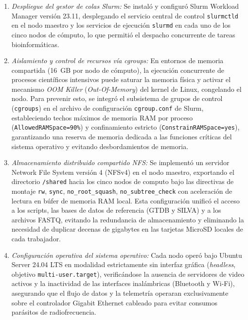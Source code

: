 \documentclass[12pt,oneside,spanish]{book}
\begin{document}
    \begin{enumerate}
        \item \textit{Despliegue del gestor de colas Slurm:} Se instaló y configuró Slurm Workload Manager versión 23.11, desplegando el servicio central de control \texttt{slurmctld} en el nodo maestro y los servicios de ejecución \texttt{slurmd} en cada uno de los cinco nodos de cómputo, lo que permitió el despacho concurrente de tareas bioinformáticas.
        
        \item \textit{Aislamiento y control de recursos vía cgroups:} En entornos de memoria compartida (16~GB por nodo de cómputo), la ejecución concurrente de procesos científicos intensivos puede saturar la memoria física y activar el mecanismo \textit{OOM Killer} (\textit{Out-Of-Memory}) del kernel de Linux, congelando el nodo. Para prevenir esto, se integró el subsistema de grupos de control (\texttt{cgroups}) en el archivo de configuración \texttt{cgroup.conf} de Slurm, estableciendo techos máximos de memoria RAM por proceso (\texttt{AllowedRAMSpace=90\%}) y confinamiento estricto (\texttt{ConstrainRAMSpace=yes}), garantizando una reserva de memoria dedicada a las funciones críticas del sistema operativo y evitando desbordamientos de memoria.
        
        \item \textit{Almacenamiento distribuido compartido NFS:} Se implementó un servidor Network File System versión 4 (NFSv4) en el nodo maestro, exportando el directorio \texttt{/shared} hacia los cinco nodos de computo bajo las directivas de montaje \texttt{rw}, \texttt{sync}, \texttt{no\_root\_squash}, \texttt{no\_subtree\_check} con aceleración de lectura en búfer de memoria RAM local. Esta configuración unificó el acceso a los scripts, las bases de datos de referencia (GTDB y SILVA) y a los archivos FASTQ, evitando la redundancia de almacenamiento y eliminando la necesidad de duplicar decenas de gigabytes en las tarjetas MicroSD locales de cada trabajador.
        
        \item \textit{Configuración operativa del sistema operativo:} Cada nodo operó bajo Ubuntu Server 24.04 LTS en modalidad estrictamente sin interfaz gráfica (\textit{headless}, objetivo \texttt{multi-user.target}), verificándose la ausencia de servidores de video activos y la inactividad de las interfaces inalámbricas (Bluetooth y Wi-Fi), asegurando que el flujo de datos y la telemetría operaran exclusivamente sobre el controlador Gigabit Ethernet cableado para evitar consumos parásitos de radiofrecuencia.
    \end{enumerate}
    
\end{document}
